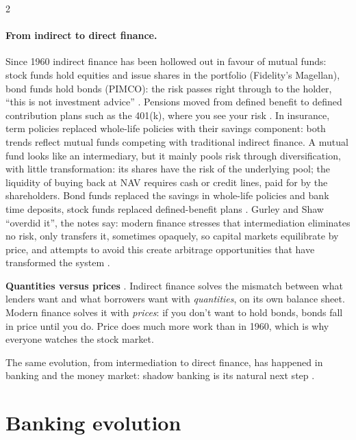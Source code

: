 \begin{paracol}{2}
\paragraph{From indirect to direct finance.} Since 1960 indirect finance has been hollowed out in favour of mutual funds: stock funds hold equities and issue shares
in the portfolio (Fidelity's Magellan), bond funds hold bonds (PIMCO): the risk passes right through to the holder, ``this is not investment advice''
. Pensions moved from defined benefit to defined contribution plans such as the
401(k), where you see your risk . In insurance, term policies replaced whole-life policies with their savings component: both trends reflect mutual funds competing
with traditional indirect finance. A mutual fund looks like an intermediary, but it mainly pools risk through diversification, with little transformation: its shares have the risk of the
underlying pool; the liquidity of buying back at NAV requires cash or credit lines, paid for by the shareholders. Bond funds replaced the savings in whole-life policies and bank time deposits,
stock funds replaced defined-benefit plans . Gurley and Shaw ``overdid it'', the notes say: modern finance stresses that intermediation eliminates no risk, only transfers
it, sometimes opaquely, so capital markets equilibrate by price, and attempts to avoid this create arbitrage opportunities that have transformed the system .

\begin{keyformulas}
\textbf{Quantities versus prices} . Indirect finance solves the mismatch between what lenders want and what
borrowers want with \emph{quantities}, on its own balance sheet. Modern finance solves it with \emph{prices}: if you don't want to hold bonds, bonds fall in
price until you do. Price does much more work than in 1960, which is why everyone watches the stock market.
\end{keyformulas}

The same evolution, from intermediation to direct finance, has happened in banking and the money market: shadow banking is its natural next step .

\section{Banking evolution}\label{sec:di-bankevol}


\end{paracol}
